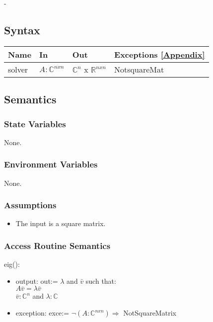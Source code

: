 \documentclass[12pt, titlepage]{article}
\begin{document}
-

\subsection{Syntax}

\begin{center}
	\begin{tabular}{p{2cm} p{4cm} p{4cm} p{4cm}}
		\hline
		\textbf{Name} & \textbf{In} & \textbf{Out} & \textbf{Exceptions} 
		\ref{Appendix} \\
		\hline
		solver & $A : \mathbb{C}^{nxn}$  & 
		$\mathbb{C}^{n}$ x $\mathbb{R}^{nxn}$ & NotsquareMat \\
		\hline
	\end{tabular}
\end{center}

\subsection{Semantics}

\subsubsection{State Variables}

None.

\subsubsection{Environment Variables}

None.

\subsubsection{Assumptions}

\begin{itemize}
	\item The input is a square matrix. 
\end{itemize}

\subsubsection{Access Routine Semantics}

\noindent eig():
\begin{itemize}
	\item output: out:= $\lambda$ and $\bar{v}$ such that:\\
	$A\bar{v} = \lambda \bar{v}$ \\
	$\bar{v} : \mathbb{C}^{n}$ and $\lambda : \mathbb{C}$
	\item exception: exce:= $ \neg (A : \mathbb{C}^{nxn}) \Rightarrow$ 
	NotSquareMatrix 
\end{itemize}
\end{document}
